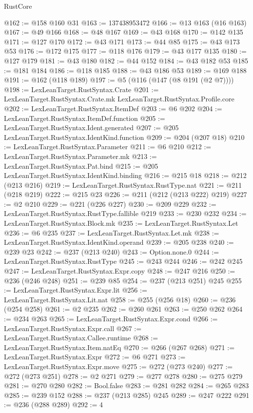 \begin{lexlean}{RustCore}
\begin{coremodule}
@162 := @158 @160 @31
@163 := 137438953472
@166 := @13 @163 (@16 @163)
@167 := @49 @166
@168 := @48 @167
@169 := @43 @168
@170 := @142 @135
@171 := @127 @170
@172 := @43 @171
@173 := @44 @85
@175 := @43 @173 @53
@176 := @172 @175
@177 := @118 @176
@179 := @43 @177 @135
@180 := @127 @179
@181 := @43 @180
@182 := @44 @152
@184 := @43 @182 @53
@185 := @181 @184
@186 := @118 @185
@188 := @43 @186 @53
@189 := @169 @188
@191 := @162 (@118 @189)
@197 := @5 (@116 (@147 (@8 @191 (@2 @7))))
@198 := LexLeanTarget.RustSyntax.Crate
@201 := LexLeanTarget.RustSyntax.Crate.mk LexLeanTarget.RustSyntax.Profile.core
@202 := LexLeanTarget.RustSyntax.ItemDef
@203 := @6 @202
@204 := LexLeanTarget.RustSyntax.ItemDef.function
@205 := LexLeanTarget.RustSyntax.Ident.generated
@207 := @205 LexLeanTarget.RustSyntax.IdentKind.function
@209 := @204 (@207 @18)
@210 := LexLeanTarget.RustSyntax.Parameter
@211 := @6 @210
@212 := LexLeanTarget.RustSyntax.Parameter.mk
@213 := LexLeanTarget.RustSyntax.Pat.bind
@215 := @205 LexLeanTarget.RustSyntax.IdentKind.binding
@216 := @215 @18
@218 := @212 (@213 @216)
@219 := LexLeanTarget.RustSyntax.RustType.nat
@221 := @211 (@218 @219)
@222 := @215 @23
@226 := @211 (@212 (@213 @222) @219)
@227 := @2 @210
@229 := @221 (@226 @227)
@230 := @209 @229
@232 := LexLeanTarget.RustSyntax.RustType.fallible @219
@233 := @230 @232
@234 := LexLeanTarget.RustSyntax.Block.mk
@235 := LexLeanTarget.RustSyntax.Let
@236 := @6 @235
@237 := LexLeanTarget.RustSyntax.Let.mk
@238 := LexLeanTarget.RustSyntax.IdentKind.operand
@239 := @205 @238
@240 := @239 @23
@242 := @237 (@213 @240)
@243 := Option.none.{0}
@244 := LexLeanTarget.RustSyntax.RustType
@245 := @243 @244
@246 := @242 @245
@247 := LexLeanTarget.RustSyntax.Expr.copy
@248 := @247 @216
@250 := @236 (@246 @248)
@251 := @239 @85
@254 := @237 (@213 @251) @245
@255 := LexLeanTarget.RustSyntax.Expr.lit
@256 := LexLeanTarget.RustSyntax.Lit.nat
@258 := @255 (@256 @18)
@260 := @236 (@254 @258)
@261 := @2 @235
@262 := @260 @261
@263 := @250 @262
@264 := @234 @263
@265 := LexLeanTarget.RustSyntax.Expr.cond
@266 := LexLeanTarget.RustSyntax.Expr.call
@267 := LexLeanTarget.RustSyntax.Callee.runtime
@268 := LexLeanTarget.RustSyntax.Item.natEq
@270 := @266 (@267 @268)
@271 := LexLeanTarget.RustSyntax.Expr
@272 := @6 @271
@273 := LexLeanTarget.RustSyntax.Expr.move
@275 := @272 (@273 @240)
@277 := @272 (@273 @251)
@278 := @2 @271
@279 := @277 @278
@280 := @275 @279
@281 := @270 @280
@282 := Bool.false
@283 := @281 @282
@284 := @265 @283
@285 := @239 @152
@288 := @237 (@213 @285) @245
@289 := @247 @222
@291 := @236 (@288 @289)
@292 := 4

\end{coremodule}
\end{lexlean}
